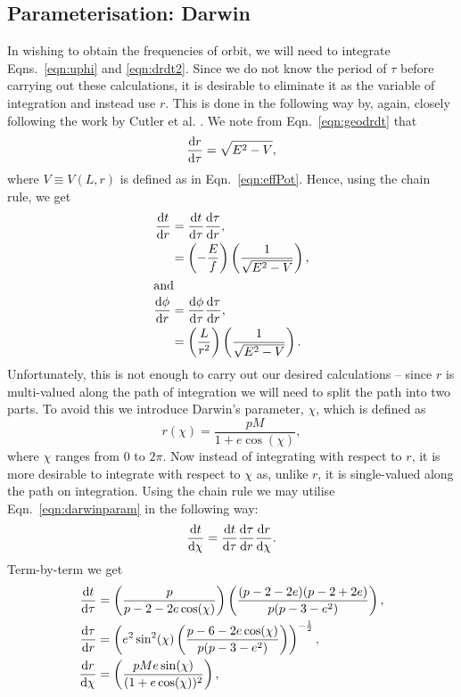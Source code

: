 \subsection{Parameterisation: Darwin}
In wishing to obtain the frequencies of orbit, we will need to integrate Eqns.~\eqref{eqn:uphi} and \eqref{eqn:drdt2}.
Since we do not know the period of $\tau$ before carrying out these calculations, it is desirable to eliminate it as the variable of integration and instead use $r$.
This is done in the following way by, again, closely following the work by Cutler et al. \cite{cutlerEtAl}.
We note from Eqn.~\eqref{eqn:geodrdt} that
\begin{equation}
\dv{r}{\tau}=\sqrt{E^2-V},
\end{equation}
where $V\equiv V(L,r)$ is defined as in Eqn.~\eqref{eqn:effPot}.
Hence, using the chain rule, we get
\begin{align}
    \dv{t}{r}&=\dv{t}{\tau}\dv{\tau}{r},\\
    &=\left(-\frac{E}{f} \right)\left(\frac{1}{\sqrt{E^2-V}} \right),\\
    \intertext{and}
    \dv{\phi}{r}&=\dv{\phi}{\tau}\dv{\tau}{r},\\
    &=\left(\frac{L}{r^2}\right)\left(\frac{1}{\sqrt{E^2-V}} \right).
\end{align}
Unfortunately, this is not enough to carry out our desired calculations -- since $r$ is multi-valued along the path of integration we will need to split the path into two parts.
To avoid this we introduce Darwin's parameter, $\chi$, which is defined as 
\begin{equation}\label{eqn:darwinparam}
r(\chi)=\frac{pM}{1+e\cos(\chi)},
\end{equation}
where $\chi$ ranges from $0$ to $2\pi$.
Now instead of integrating with respect to $r$, it is more desirable to integrate with respect to $\chi$ as, unlike $r$, it is single-valued along the path on integration.
Using the chain rule we may utilise Eqn.~\eqref{eqn:darwinparam} in the following way:
\begin{equation}
\dv{t}{\chi}=\dv{t}{\tau}\dv{\tau}{r}\dv{r}{\chi}.
\end{equation}
Term-by-term we get
\begin{align}
\dv{t}{\tau}&=\left(\frac{p}{p-2-2e\cos(\chi)} \right)\left(\frac{(p-2-2e)(p-2+2e)}{p(p-3-e^2)}\right),\\
\dv{\tau}{r}&=\left(e^2\sin^2(\chi)\left(\frac{p-6-2e\cos(\chi)}{p(p-3-e^2)} \right)\right)^{-\frac{1}{2}},\\
\dv{r}{\chi}&=\left(\frac{pMe\sin(\chi)}{(1+e\cos(\chi))^2} \right),
\end{align}
